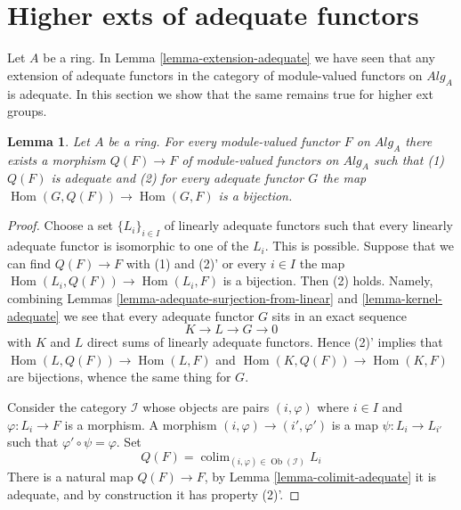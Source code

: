 \documentclass{stacks-project}
\theoremstyle{plain}
\newtheorem{lemma}[subsection]{Lemma}
\theoremstyle{definition}
\theoremstyle{remark}
\numberwithin{equation}{subsection}
\def\colim{\mathop{\mathrm{colim}}\nolimits}
\def\Hom{\mathop{\mathrm{Hom}}\nolimits}
\def\Ob{\mathop{\mathrm{Ob}}\nolimits}
\begin{document}
\section{Higher exts of adequate functors}
\label{section-higher-ext}

\noindent
Let $A$ be a ring. In
Lemma \ref{lemma-extension-adequate}
we have seen that any extension of adequate functors in the category
of module-valued functors on $\textit{Alg}_A$ is adequate. In this
section we show that the same remains true for higher ext groups.

\begin{lemma}
\label{lemma-adjoint}
Let $A$ be a ring.
For every module-valued functor $F$ on $\textit{Alg}_A$
there exists a morphism $Q(F) \to F$ of module-valued functors on
$\textit{Alg}_A$ such that (1) $Q(F)$ is adequate and (2) for every
adequate functor $G$ the map $\Hom(G, Q(F)) \to \Hom(G, F)$
is a bijection.
\end{lemma}

\begin{proof}
Choose a set $\{L_i\}_{i \in I}$ of linearly adequate functors such that
every linearly adequate functor is isomorphic to one of the $L_i$.
This is possible. Suppose that we can find $Q(F) \to F$ with (1) and
(2)' or every $i \in I$ the map $\Hom(L_i, Q(F)) \to \Hom(L_i, F)$
is a bijection. Then (2) holds. Namely, combining
Lemmas \ref{lemma-adequate-surjection-from-linear} and
\ref{lemma-kernel-adequate}
we see that every adequate functor $G$ sits in an exact sequence
$$
K \to L \to G \to 0
$$
with $K$ and $L$ direct sums of linearly adequate functors. Hence (2)'
implies that
$\Hom(L, Q(F)) \to \Hom(L, F)$
and
$\Hom(K, Q(F)) \to \Hom(K, F)$
are bijections, whence the same thing for $G$.

\medskip\noindent
Consider the category $\mathcal{I}$ whose objects are pairs
$(i, \varphi)$ where $i \in I$ and $\varphi : L_i \to F$ is a morphism.
A morphism $(i, \varphi) \to (i', \varphi')$ is a map
$\psi : L_i \to L_{i'}$ such that $\varphi' \circ \psi = \varphi$.
Set
$$
Q(F) = \colim_{(i, \varphi) \in \Ob(\mathcal{I})} L_i
$$
There is a natural map $Q(F) \to F$, by
Lemma \ref{lemma-colimit-adequate}
it is adequate, and by construction it has property (2)'.
\end{proof}
\end{document}
